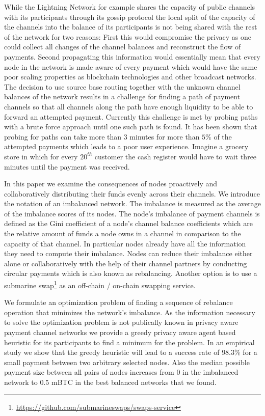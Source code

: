 \documentclass[a4paper]{paper}
\begin{document}
While the Lightning Network for example shares the capacity of public channels with its participants through its gossip protocol the local split of the capacity of the channels into the balance of its participants is not being shared with the rest of the network for two reasons:
First this would compromise the privacy as one could collect all changes of the channel balances and reconstruct the flow of payments.
Second propagating this information would essentially mean that every node in the network is made aware of every payment which would have the same poor scaling properties as blockchain technologies and other broadcast networks.
The decision to use source base routing together with the unknown channel balances of the network results in a challenge for finding a path of payment channels so that all channels along the path have enough liquidity to be able to forward an attempted payment.
Currently this challenge is met by probing paths with a brute force approach until one such path is found.
It has been shown that probing for paths can take more than 3 minutes for more than $5\%$ of the attempted payments \cite{decker2019lnconf} which leads to a poor user experience.
Imagine a grocery store in which for every $20^{th}$ customer the cash register would have to wait three minutes until the payment was received.

In this paper we examine the consequences of nodes proactively and collaboratively distributing their funds evenly across their channels.
We introduce the notation of an imbalanced network.
The imbalance is measured as the average of the imbalance scores of its nodes.
The node's imbalance of payment channels is defined as the Gini coefficient of a node's channel balance coefficients which are the relative amount of funds a node owns in a channel in comparison to the capacity of that channel.
In particular nodes already have all the information they need to compute their imbalance. 
Nodes can reduce their imbalance either alone or collaboratively with the help of their channel partners by conducting circular payments which is also known as rebalancing.
Another option is to use a submarine swap\footnote{\url{https://github.com/submarineswaps/swaps-service}} as an off-chain / on-chain swapping service.

We formulate an optimization problem of finding a sequence of rebalance operation that minimizes the network's imbalance.
As the information necessary to solve the optimization problem is not publically known in privacy aware payment channel networks we provide a greedy privacy aware agent based heuristic for its participants to find a minimum for the problem. 
In an empirical study we show that the greedy heuristic will lead to a success rate of $98.3\%$ for a small payment between two arbitrary selected nodes.
Also the median possible payment size between all pairs of nodes increases from $0$ in the imbalanced network to $0.5$ mBTC in the best balanced networks that we found.
\end{document}
